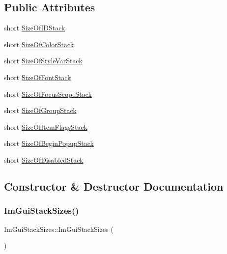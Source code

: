 \subsection*{Public Attributes}
\begin{DoxyCompactItemize}
\item 
short \hyperlink{structImGuiStackSizes_ace27d02b760e0224c041d44bea926ae6}{Size\+Of\+I\+D\+Stack}
\item 
short \hyperlink{structImGuiStackSizes_ada3c64baaac1256f04d5f1a99dfb6ed2}{Size\+Of\+Color\+Stack}
\item 
short \hyperlink{structImGuiStackSizes_a038e2705132e5561bb187148a8395be0}{Size\+Of\+Style\+Var\+Stack}
\item 
short \hyperlink{structImGuiStackSizes_a5430682ade553552a42a7012b83c212d}{Size\+Of\+Font\+Stack}
\item 
short \hyperlink{structImGuiStackSizes_a99fa2a45397945e6f0209ab556ca19d9}{Size\+Of\+Focus\+Scope\+Stack}
\item 
short \hyperlink{structImGuiStackSizes_a1fd94592cd82ddac79aab6cc01cb8703}{Size\+Of\+Group\+Stack}
\item 
short \hyperlink{structImGuiStackSizes_afa2af2775b3925e0dfd9fac22e097e30}{Size\+Of\+Item\+Flags\+Stack}
\item 
short \hyperlink{structImGuiStackSizes_a6851e33fafec9be3c27412de81ba6e68}{Size\+Of\+Begin\+Popup\+Stack}
\item 
short \hyperlink{structImGuiStackSizes_a955ce6bbb9e231d67d087bd886848dc5}{Size\+Of\+Disabled\+Stack}
\end{DoxyCompactItemize}


\subsection{Constructor \& Destructor Documentation}
\mbox{\label{structImGuiStackSizes_ac8d9f1bb427e2480bbae8acc55ee58a2}} 
\subsubsection{\texorpdfstring{Im\+Gui\+Stack\+Sizes()}{ImGuiStackSizes()}}
{\footnotesize\ttfamily Im\+Gui\+Stack\+Sizes\+::\+Im\+Gui\+Stack\+Sizes (\begin{DoxyParamCaption}{ }\end{DoxyParamCaption})\hspace{0.3cm}{\ttfamily [inline]}}



